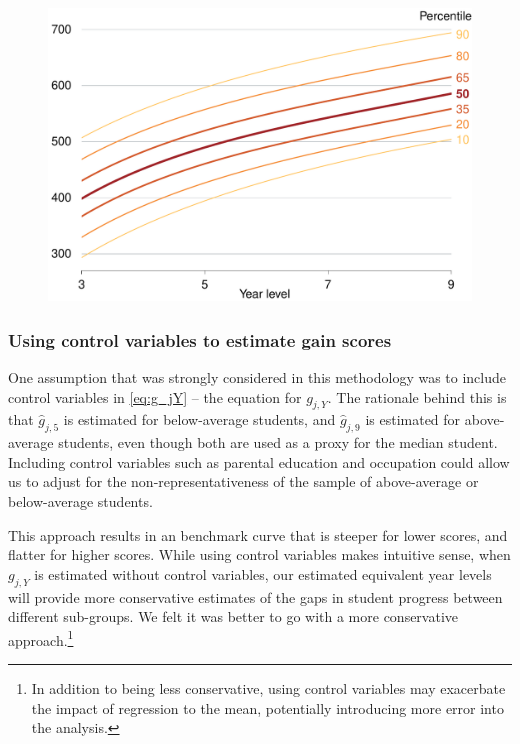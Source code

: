 \begin{figure}[t]
 \includegraphics[width=\columnwidth]{atlas/Percentiles_N.pdf}\label{fig:percentiles}

\end{figure}

\subsubsection{Using control variables to estimate gain scores}

One assumption that was strongly considered in this methodology was to include control variables in \cref{eq:g_jY} -- the equation for $g_{j,Y}$. The rationale behind this is that $\widehat{g}_{j,5}$ is estimated for below-average students, and $\widehat{g}_{j,9}$ is estimated for above-average students, even though both are used as a proxy for the median student. Including control variables such as parental education and occupation could allow us to adjust for the non-representativeness of the sample of above-average or below-average students.

\newpage
This approach results in an benchmark curve that is steeper for lower scores, and flatter for higher scores. While using control variables makes intuitive sense, when $g_{j,Y}$ is estimated without control variables, our estimated equivalent year levels will provide more conservative estimates of the gaps in student progress between different sub-groups. We felt it was better to go with a more conservative approach.\footnote{In addition to being less conservative, using control variables may exacerbate the impact of regression to the mean, potentially introducing more error into the analysis.}

